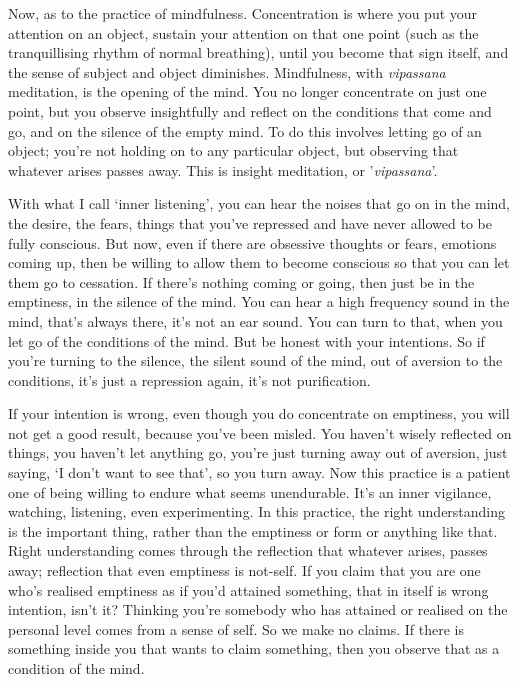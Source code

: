 
Now, as to the practice of mindfulness. Concentration is where you put your attention on an object, sustain your attention on that one point (such as the tranquillising rhythm of normal breathing), until you become that sign itself, and the sense of subject and object diminishes. Mindfulness, with \textit{vipassana} meditation, is the opening of the mind. You no longer concentrate on just one point, but you observe insightfully and reflect on the conditions that come and go, and on the silence of the empty mind. To do this involves letting go of an object; you're not holding on to any particular object, but observing that whatever arises passes away. This is insight meditation, or '\textit{vipassana}'.

With what I call `inner listening', you can hear the noises that go on in the mind, the desire, the fears, things that you've repressed and have never allowed to be fully conscious. But now, even if there are obsessive thoughts or fears, emotions coming up, then be willing to allow them to become conscious so that you can let them go to cessation. If there's nothing coming or going, then just be in the emptiness, in the silence of the mind. You can hear a high frequency sound in the mind, that's always there, it's not an ear sound. You can turn to that, when you let go of the conditions of the mind. But be honest with your intentions. So if you're turning to the silence, the silent sound of the mind, out of aversion to the conditions, it's just a repression again, it's not purification.

If your intention is wrong, even though you do concentrate on emptiness, you will not get a good result, because you've been misled. You haven't wisely reflected on things, you haven't let anything go, you're just turning away out of aversion, just saying, `I don't want to see that', so you turn away. Now this practice is a patient one of being willing to endure what seems unendurable. It's an inner vigilance, watching, listening, even experimenting. In this practice, the right understanding is the important thing, rather than the emptiness or form or anything like that. Right understanding comes through the reflection that whatever arises, passes away; reflection that even emptiness is not-self. If you claim that you are one who's realised emptiness as if you'd attained something, that in itself is wrong intention, isn't it? Thinking you're somebody who has attained or realised on the personal level comes from a sense of self. So we make no claims. If there is something inside you that wants to claim something, then you observe that as a condition of the mind.

